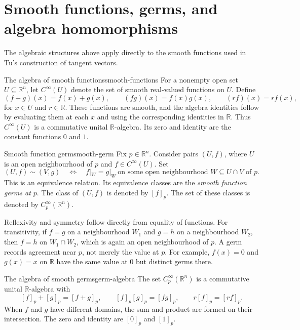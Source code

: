 \documentclass[10pt,a4paper]{article}
\newcommand{\R}{\mathbb{R}}
\begin{document}
\section{Smooth functions, germs, and algebra homomorphisms}

The algebraic structures above apply directly to the smooth functions used
in Tu's construction of tangent vectors.

\begin{examplebox}{The algebra of smooth functions}{smooth-functions}
For a nonempty open set $U\subseteq\R^n$, let $C^\infty(U)$ denote the set of
smooth real-valued functions on $U$. Define
\[
  (f+g)(x)=f(x)+g(x),\qquad
  (fg)(x)=f(x)g(x),\qquad
  (rf)(x)=rf(x),
\]
for $x\in U$ and $r\in\R$. These functions are smooth, and the algebra
identities follow by evaluating them at each $x$ and using the corresponding
identities in $\R$. Thus $C^\infty(U)$ is a commutative unital $\R$-algebra.
Its zero and identity are the constant functions $0$ and $1$.
\end{examplebox}

\begin{definition}{Smooth function germ}{smooth-germ}
Fix $p\in\R^n$. Consider pairs $(U,f)$, where $U$ is an open neighbourhood
of $p$ and $f\in C^\infty(U)$. Set
\[
  (U,f)\sim(V,g)
  \quad\Longleftrightarrow\quad
  f|_W=g|_W\ \text{on some open neighbourhood }W\subseteq U\cap V\text{ of }p.
\]
This is an equivalence relation. Its equivalence classes are the
\emph{smooth function germs at $p$}. The class of $(U,f)$ is denoted by
$[f]_p$. The set of these classes is denoted by $C_p^\infty(\R^n)$.
\end{definition}

Reflexivity and symmetry follow directly from equality of functions.
For transitivity, if $f=g$ on a neighbourhood $W_1$ and $g=h$ on a
neighbourhood $W_2$, then $f=h$ on $W_1\cap W_2$, which is again an open
neighbourhood of $p$. A germ records agreement near $p$, not merely the
value at $p$. For example, $f(x)=0$ and $g(x)=x$ on $\R$ have the same value
at $0$ but distinct germs there.

\begin{proposition}{The algebra of smooth germs}{germ-algebra}
The set $C_p^\infty(\R^n)$ is a commutative unital $\R$-algebra with
\[
  [f]_p+[g]_p=[f+g]_p,\qquad
  [f]_p[g]_p=[fg]_p,\qquad
  r[f]_p=[rf]_p.
\]
When $f$ and $g$ have different domains, the sum and product are formed on
their intersection. The zero and identity are $[0]_p$ and $[1]_p$.
\end{proposition}
\end{document}
